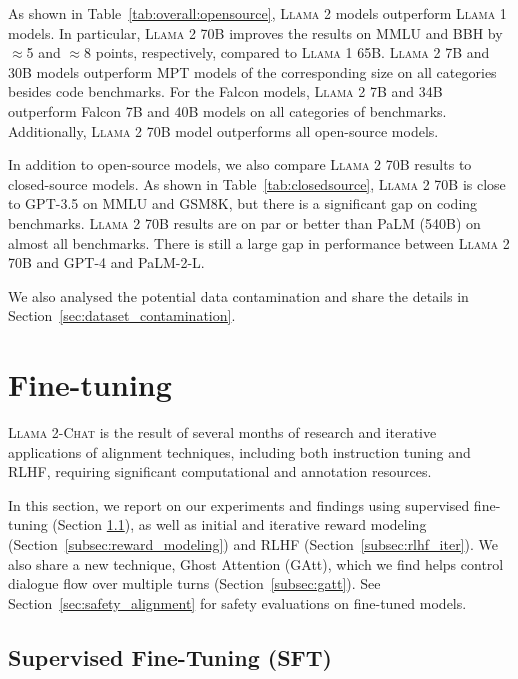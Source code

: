 As shown in Table~\ref{tab:overall:opensource}, \textsc{Llama 2} models outperform \textsc{Llama 1} models. In particular, \textsc{Llama 2} 70B improves the results on MMLU and BBH by $\approx$5 and $\approx$8 points, respectively, compared to \textsc{Llama 1} 65B. \textsc{Llama 2} 7B and 30B models outperform MPT models of the corresponding size on all categories besides code benchmarks. For the Falcon models, \textsc{Llama 2} 7B and 34B outperform Falcon 7B and 40B models on all categories of benchmarks. Additionally, \textsc{Llama 2} 70B model outperforms all open-source models.

In addition to open-source models, we also compare \textsc{Llama 2} 70B results to closed-source models. As shown in Table~\ref{tab:closedsource}, \textsc{Llama 2} 70B is close to GPT-3.5 \citep{openai2023gpt4} on MMLU and GSM8K, but there is a significant gap on coding benchmarks. \textsc{Llama 2} 70B results are on par or better than PaLM (540B) \citep{palm1} on almost all benchmarks. There is still a large gap in performance between \textsc{Llama 2} 70B and GPT-4 and PaLM-2-L.

We also analysed the potential data contamination and share the details in  Section~\ref{sec:dataset_contamination}.

\section{Fine-tuning}
\label{sec:fine_tuning}

\textsc{Llama 2-Chat} is the result of several months of research and iterative applications of alignment techniques, including both instruction tuning and RLHF, requiring significant computational and annotation resources.

In this section, we report on our experiments and findings using supervised fine-tuning (Section \ref{subsec:SFT}), as well as initial and iterative reward modeling (Section~\ref{subsec:reward_modeling}) and RLHF (Section~\ref{subsec:rlhf_iter}). We also share a new technique, Ghost Attention (GAtt), which we find helps control dialogue flow over multiple turns (Section~\ref{subsec:gatt}). See Section~\ref{sec:safety_alignment} for safety evaluations on fine-tuned models.

\subsection{Supervised Fine-Tuning (SFT)} 
\label{subsec:SFT}

